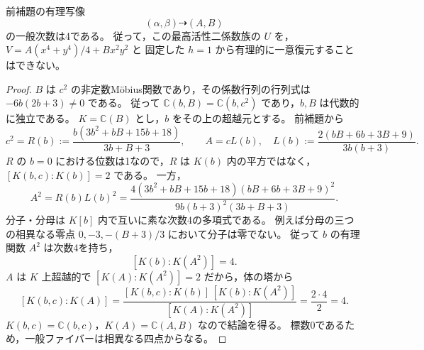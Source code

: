 \begin{proposition}[最高活性係数の写像の一般次数]
\label{prop:binary-shadow-generic-degree-four}
前補題の有理写像
\[
                 (\alpha,\beta)\dashrightarrow(A,B)
\]
の一般次数は4である。
従って，この最高活性二係数族の $U$ を，$V=A(x^4+y^4)/4+Bx^2y^2$ と
固定した $h=1$ から有理的に一意復元することはできない。
\end{proposition}
\begin{proof}
$B$ は $c^2$ の非定数M\"obius関数であり，その係数行列の行列式は
$-6b(2b+3)\ne0$ である。
従って $\mathbb C(b,B)=\mathbb C(b,c^2)$ であり，$b,B$ は代数的に独立である。
$K=\mathbb C(B)$ とし，$b$ をその上の超越元とする。
前補題から
\[
 c^2=R(b):=\frac{b(3b^2+bB+15b+18)}{3b+B+3},\qquad
 A=cL(b),\quad
 L(b):=\frac{2(bB+6b+3B+9)}{3b(b+3)}.
\]
$R$ の $b=0$ における位数は1なので，$R$ は $K(b)$ 内の平方ではなく，
$[K(b,c):K(b)]=2$ である。
一方，
\[
 A^2=R(b)L(b)^2
 =\frac{4(3b^2+bB+15b+18)(bB+6b+3B+9)^2}
        {9b(b+3)^2(3b+B+3)}.
\]
分子・分母は $K[b]$ 内で互いに素な次数4の多項式である。
例えば分母の三つの相異なる零点
$0,-3,-(B+3)/3$ において分子は零でない。
従って $b$ の有理関数 $A^2$ は次数4を持ち，
\[
                   [K(b):K(A^2)]=4.
\]
$A$ は $K$ 上超越的で $[K(A):K(A^2)]=2$ だから，体の塔から
\[
 [K(b,c):K(A)]
 =\frac{[K(b,c):K(b)]\,[K(b):K(A^2)]}
        {[K(A):K(A^2)]}
 =\frac{2\cdot4}{2}=4.
\]
$K(b,c)=\mathbb C(b,c)$，$K(A)=\mathbb C(A,B)$ なので結論を得る。
標数0であるため，一般ファイバーは相異なる四点からなる。
\end{proof}

